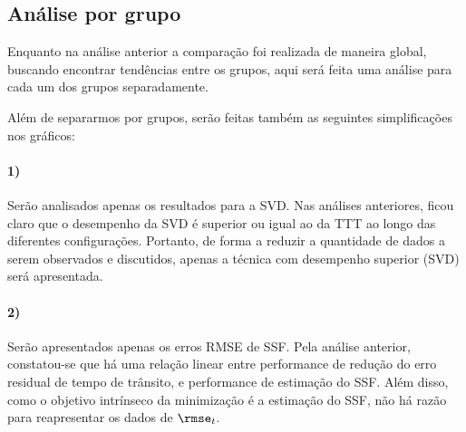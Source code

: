 \lipsum[2]


\subsection{Análise por grupo}

Enquanto na análise anterior a comparação foi realizada de maneira global, buscando encontrar tendências entre os grupos, aqui será feita uma análise para cada um dos grupos separadamente.

Além de separarmos por grupos, serão feitas também as seguintes simplificações nos gráficos:

\paragraph{1)} Serão analisados apenas os resultados para a SVD. Nas análises anteriores, ficou claro que o desempenho da SVD é superior ou igual ao da TTT ao longo das diferentes configurações. Portanto, de forma a reduzir a quantidade de dados a serem observados e discutidos, apenas a técnica com desempenho superior (SVD) será apresentada.

\paragraph{2)} Serão apresentados apenas os erros RMSE de SSF. Pela análise anterior, constatou-se que há uma relação linear entre performance de redução do erro residual de tempo de trânsito, e performance de estimação do SSF. Além disso, como o objetivo intrínseco da minimização é a estimação do SSF, não há razão para reapresentar os dados de $\rmse_{t}$.




